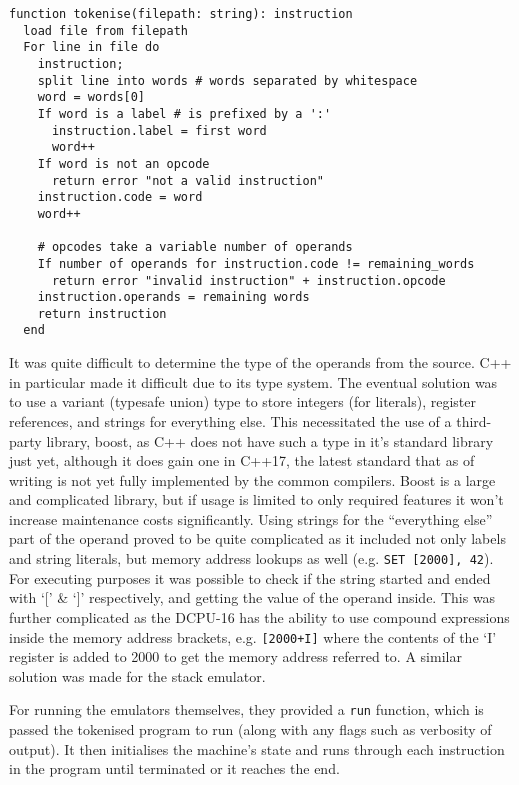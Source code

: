 \begin{lstlisting}[caption={Tokenising algorithm for the DCPU-16}]
function tokenise(filepath: string): instruction
  load file from filepath
  For line in file do
    instruction;
    split line into words # words separated by whitespace
    word = words[0]
    If word is a label # is prefixed by a ':'
      instruction.label = first word
      word++
    If word is not an opcode
      return error "not a valid instruction"
    instruction.code = word
    word++

    # opcodes take a variable number of operands
    If number of operands for instruction.code != remaining_words
      return error "invalid instruction" + instruction.opcode
    instruction.operands = remaining words
    return instruction
  end
\end{lstlisting}

It was quite difficult to determine the type of the operands from the source.
C++ in particular made it difficult due to its type system. The eventual
solution was to use a variant (typesafe union) type to store integers (for
literals), register references, and strings for everything else. This
necessitated the use of a third-party library, boost, as C++ does not have such
a type in it's standard library just yet, although it does gain one in C++17,
the latest standard that as of writing is not yet fully implemented by the
common compilers. Boost is a large and complicated library, but if usage is
limited to only required features it won't increase maintenance costs
significantly.
Using strings for the ``everything else'' part of the operand proved to be quite
complicated as it included not only labels and string literals, but memory
address lookups as well (e.g.  \lstinline{SET [2000], 42}). For executing
purposes it was possible to check if the string started and ended with `[' \&
`]' respectively, and getting the value of the operand inside. This was further
complicated as the DCPU-16 has the ability to use compound expressions inside
the memory address brackets, e.g.  \lstinline{[2000+I]} where the contents of
the `I' register is added to 2000 to get the memory address referred to. A
similar solution was made for the stack emulator.

For running the emulators themselves, they provided a \lstinline{run} function,
which is passed the tokenised program to run (along with any flags such as
verbosity of output). It then initialises the machine's state and runs through
each instruction in the program until terminated or it reaches the end.

